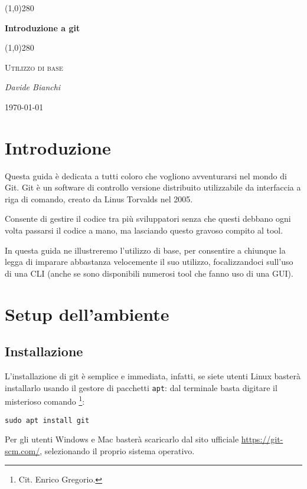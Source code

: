 \documentclass[a4paper, 11pt]{article}
\begin{document}
 \clearpage
 \begin{titlepage}
 	\centering
 	\vspace*{5cm}
 	\line(1,0){280} \\
 	{\huge\bfseries Introduzione a git\par}
 	\line(1,0){280} \\
 	\vspace{0.5cm}
 	{\scshape\Large Utilizzo di base\par}
 	\vspace{2cm}
 	{\Large\itshape Davide Bianchi\par}
 	\vspace{1cm}
 	
 	\vspace{5cm}
 	\vspace*{\fill}
 	{\large \today\par}
 \end{titlepage}
 \thispagestyle{empty}
 \newpage
 \tableofcontents
 \newpage
	
	\section{Introduzione}
	Questa guida è dedicata a tutti coloro che vogliono avventurarsi nel mondo di Git. Git è un software di controllo versione distribuito utilizzabile da interfaccia a riga di comando, creato da Linus Torvalds nel 2005.
	
	Consente di gestire il codice tra più sviluppatori senza che questi debbano ogni volta passarsi il codice a mano, ma lasciando questo gravoso compito al tool.
	
	In questa guida ne illustreremo l'utilizzo di base, per consentire a chiunque la legga di imparare abbastanza velocemente il suo utilizzo, focalizzandoci sull'uso di una CLI (anche se sono disponibili numerosi tool che fanno uso di una GUI).
	
	\section{Setup dell'ambiente}
	\subsection{Installazione}
	L'installazione di git è semplice e immediata, infatti, se siete utenti Linux basterà installarlo usando il gestore di pacchetti \lstinline|apt|: dal terminale basta digitare il misterioso comando \footnote{Cit. Enrico Gregorio.}: \begin{lstlisting}
sudo apt install git
	\end{lstlisting}
	Per gli utenti Windows e Mac basterà scaricarlo dal sito ufficiale \url{https://git-scm.com/}, selezionando il proprio sistema operativo.
	
\end{document}
